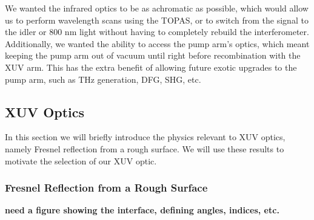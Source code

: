 We wanted the infrared optics to be as achromatic as possible, which would allow us to perform wavelength scans using the TOPAS, or to switch from the signal to the idler or 800 nm light without having to completely rebuild the interferometer. Additionally, we wanted the ability to access the pump arm's optics, which meant keeping the pump arm out of vacuum until right before recombination with the XUV arm. This has the extra benefit of allowing future exotic upgrades to the pump arm, such as THz generation, DFG, SHG, etc.

\subsection{XUV Optics}

In this section we will briefly introduce the physics relevant to XUV optics, namely Fresnel reflection from a rough surface. We will use these results to motivate the selection of our XUV optic.

\subsubsection{Fresnel Reflection from a Rough Surface}

\textbf{need a figure showing the interface, defining angles, indices, etc.}


